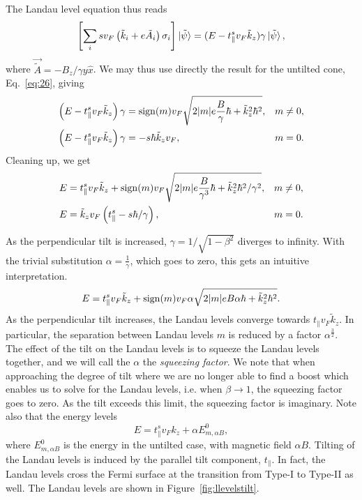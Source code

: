 The Landau level equation thus reads
\begin{equation}
  \label{eq:43}
  \left[
  \sum\limits_{i} s v_{F} \left(\tilde{k}_{i} + e \tilde{A}_{i} \right) \sigma _{i}
\right  ] \ket{\tilde{\psi}} =
(E- t^s_{\parallel} v_{F} \tilde{k}_{z}) \gamma \ket{\tilde{\psi}},
\end{equation}
where \(\vec{\tilde{A}}=-B_{z}/ \gamma y \hat{x}\).
We may thus use directly the result for the untilted cone, Eq.~\eqref{eq:26}, giving
\begin{subequations}
  \label{eq:44}
  \begin{align}
    \left(E - t^s_{\parallel} v_{F} \tilde{k}_{z} \right) \gamma &= \operatorname{sign} (m) v_{F} \sqrt{2 |m| e \frac{B}{ \gamma } \hbar + \tilde{k}_{z}^2 \hbar ^2}, & m \neq 0,\\
    \left(E - t^s_{\parallel} v_{F} \tilde{k}_{z} \right) \gamma &= - s \hbar  \tilde{k}_{z} v_{F}, & m=0.
  \end{align}
\end{subequations}
Cleaning up, we get
\begin{subequations}
  \label{eq:45}
  \begin{align}
    E &= t^s_{\parallel} v_F \tilde{k}_{z} + \operatorname{sign}(m) v_F \sqrt{2 |m| e \frac{B}{\gamma ^3} \hbar + \tilde{k}_{z}^2\hbar ^2 /\gamma ^2}, & m\neq 0,\\
    E &= \tilde{k}_{z} v_{F} \left( t^s_{\parallel}  - s \hbar / \gamma  \right), & m=0.
  \end{align}
\end{subequations}

As the perpendicular tilt is increased, \(\gamma = 1 / \sqrt{1-\beta ^{2}}\) diverges to infinity.
With the trivial substitution \(\alpha = \frac{1}{\gamma }\), which goes to zero, this gets an intuitive interpretation.
\begin{equation}
  \label{eq:46}
  E = t^s_{\parallel} v_{F} \tilde{k}_{z} + \operatorname{sign}(m) v_F \alpha \sqrt{2 |m| e B \alpha \hbar + \tilde{k}_{z}^2\hbar ^2}.
\end{equation}
As the perpendicular tilt increases, the Landau levels converge towards \(t_{\parallel} v_{F} \tilde{k}_{z}\).
In particular, the separation between Landau levels \(m\)  is reduced by a factor \(\alpha ^{\frac{3}{2}}\).
The effect of the tilt on the Landau levels is to squeeze the Landau levels together, and we will call the \(\alpha \) the \emph{squeezing factor}.
We note that when approaching the degree of tilt where we are no longer able to find a boost which enables us to solve for the Landau levels, i.e. when \(\beta \to 1\), the squeezing factor goes to zero.
As the tilt exceeds this limit, the squeezing factor is imaginary.
Note also that the energy levels
\[
E = t^s_{\parallel} v_F k_z + \alpha E^0_{m, \alpha B},
\]
where \( E^0_{m, \alpha B} \) is the energy in the untilted case, with magnetic field \( \alpha B \).
Tilting of the Landau levels is induced by the parallel tilt component, \( t_\parallel \).
In fact, the Landau levels cross the Fermi surface at the transition from Type-I to Type-II as well.
The Landau levels are shown in Figure~\ref{fig:llevelstilt}.


